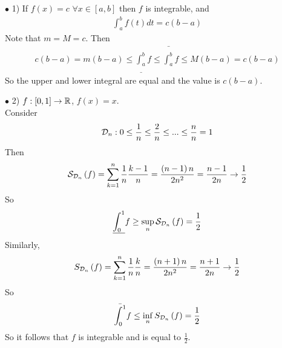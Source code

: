 \documentclass[a4paper]{article}
\begin{document}
\begin{eg}
$\bullet$ 1) If $f\left(x\right)=c$ $\forall x\in \left[a,b\right]$ then $f$ is integrable, and
\begin{equation*}
\begin{aligned}
\int_a^b f\left(t\right) dt = c\left(b-a\right)
\end{aligned}
\end{equation*}
Note that $m=M=c$. Then
\begin{equation*}
\begin{aligned}
c\left(b-a\right)=m\left(b-a\right) \leq \underline{\int_a^b}f\leq\bar{\int_a^b} f\leq M\left(b-a\right) = c\left(b-a\right)
\end{aligned}
\end{equation*}
So the upper and lower integral are equal and the value is $c\left(b-a\right)$.
\end{eg}

$\bullet$ 2) $f:\left[0,1\right] \to \mathbb{R}$, $f\left(x\right) = x$.\\
Consider
\begin{equation*}
\begin{aligned}
\mathcal{D}_n: 0\leq\frac{1}{n}\leq\frac{2}{n}\leq...\leq\frac{n}{n}=1
\end{aligned}
\end{equation*}
Then
\begin{equation*}
\begin{aligned}
\mathcal{S}_{\mathcal{D}_n}\left(f\right) = \sum_{k=1}^n \frac{1}{n}\frac{k-1}{n} = \frac{\left(n-1\right)n}{2n^2} = \frac{n-1}{2n} \to \frac{1}{2}
\end{aligned}
\end{equation*}
So
\begin{equation*}
\begin{aligned}
\underline{\int_0^1} f \geq \sup_n \mathcal{S}_{\mathcal{D}_n}\left(f\right) = \frac{1}{2}
\end{aligned}
\end{equation*}
Similarly,
\begin{equation*}
\begin{aligned}
S_{\mathcal{D}_n}\left(f\right) = \sum_{k=1}^n \frac{1}{n}\frac{k}{n} = \frac{\left(n+1\right)n}{2n^2} = \frac{n+1}{2n}\to \frac{1}{2}
\end{aligned}
\end{equation*}
So
\begin{equation*}
\begin{aligned}
\bar{\int_0^1}f \leq \inf_n S_{\mathcal{D}_n}\left(f\right) = \frac{1}{2}
\end{aligned}
\end{equation*}
So it follows that $f$ is integrable and is equal to $\frac{1}{2}$.
\end{document}
